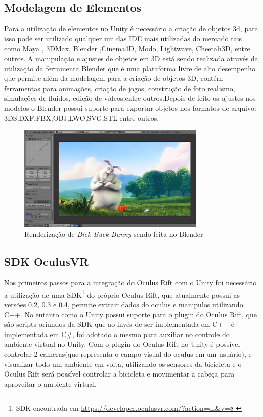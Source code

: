 \subsection{Modelagem de Elementos} %
\label{sub:modelagem}
	Para a utilização de elementos no Unity é necessário a criação de objetos 3d, para isso pode ser utilizado qualquer um das IDE mais utilizadas do mercado tais como Maya , 3DMax, Blender ,Cinema4D, Modo, Lightwave, Cheetah3D, entre outros. A manipulação e ajustes de objetos em 3D está sendo realizada através da utilização da ferramenta Blender  que é uma plataforma livre de alto desempenho que permite além da modelagem para a criação de objetos 3D, contém ferramentas para animações, criação de jogos, construção de foto realismo, simulações de fluidos, edição de vídeos,entre outros.Depois de feito os ajustes nos modelos o Blender possui suporte para exportar objetos nos formatos de arquivo: 3DS,DXF,FBX,OBJ,LWO,SVG,STL entre outros.

\begin{figure}[h]
  \centering
  \includegraphics[width=0.8\textwidth]
      {figuras/blender.png}
  \caption{Renderização de \textit{Bick Buck Bunny} sendo feita no Blender}
  \label{coordenadas-rift}
\end{figure}

\subsection{SDK OculusVR}
\label{sub:sdk_ovr}
      Nos primeiros passos para a integração do Oculus Rift com o Unity foi necessário a utilização de uma SDK\footnote{ SDK encontrada em \url{https://developer.oculusvr.com/?action=dl&v=8 }} do próprio Oculus Rift, que atualmente possui as versões 0.2, 0.3 e 0.4, permite extrair dados do oculus e manipulos utilizando C++. No entanto como o Unity possui suporte para o plugin do Oculus Rift, que são scripts oriundos da SDK que ao invés de ser implementada em C++ é implementada em C\#, foi adotado o mesmo para auxiliar no controle do ambiente virtual no Unity.
     Com o plugin do Oculus Rift no Unity é possível controlar 2 cameras(que representa o campo visual do oculus em um usuário), e visualizar todo um ambiente em volta, utilizando os sensores da bicicleta e o Oculus Rift será possível controlar a bicicleta e movimentar a cabeça para aproveitar o ambiente virtual.

